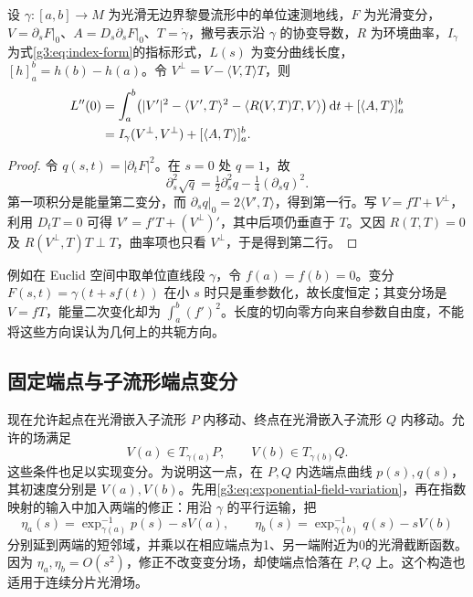 \begin{theorem}[长度第二变分]\label{g3:thm:length-second-variation}
	设 \(\gamma:[a,b]\to M\) 为光滑无边界黎曼流形中的单位速测地线，\(F\) 为光滑变分，\(V=\partial_sF|_0\)、\(A=D_s\partial_sF|_0\)、\(T=\dot\gamma\)，撇号表示沿 \(\gamma\) 的协变导数，\(R\) 为环境曲率，\(I_\gamma\) 为式\eqref{g3:eq:index-form}的指标形式，\(L(s)\) 为变分曲线长度，\([h]_a^b=h(b)-h(a)\)。令 \(V^\perp=V-\langle V,T\rangle T\)，则
	\begin{align}
		L''(0)&=\int_a^b\bigl(|V'|^2-\langle V',T\rangle^2
		-\langle R(V,T)T,V\rangle\bigr)\,\mathrm dt
		+[\langle A,T\rangle]_a^b\notag\\
		&=I_\gamma(V^\perp,V^\perp)+[\langle A,T\rangle]_a^b.
		\label{g3:eq:length-second-variation}
	\end{align}
\end{theorem}
\begin{proof}
	令 \(q(s,t)=|\partial_tF|^2\)。在 \(s=0\) 处 \(q=1\)，故
	\[
		\partial_s^2\sqrt q=\tfrac12\partial_s^2q-\tfrac14(\partial_sq)^2.
	\]
	第一项积分是能量第二变分，而 \(\partial_sq|_0=2\langle V',T\rangle\)，得到第一行。写 \(V=fT+V^\perp\)，利用 \(D_tT=0\) 可得 \(V'=f'T+(V^\perp)'\)，其中后项仍垂直于 \(T\)。又因 \(R(T,T)=0\) 及 \(R(V^\perp,T)T\perp T\)，曲率项也只看 \(V^\perp\)，于是得到第二行。
\end{proof}

例如在 Euclid 空间中取单位直线段 \(\gamma\)，令 \(f(a)=f(b)=0\)。变分 \(F(s,t)=\gamma(t+sf(t))\) 在小 \(s\) 时只是重参数化，故长度恒定；其变分场是 \(V=fT\)，能量二次变化却为 \(\int_a^b(f')^2\)。长度的切向零方向来自参数自由度，不能将这些方向误认为几何上的共轭方向。

\subsection{固定端点与子流形端点变分}
\label{g3:subsec:0601:04}

现在允许起点在光滑嵌入子流形 \(P\) 内移动、终点在光滑嵌入子流形 \(Q\) 内移动。允许的场满足
\[
	V(a)\in T_{\gamma(a)}P,\qquad V(b)\in T_{\gamma(b)}Q.
\]
这些条件也足以实现变分。为说明这一点，在 \(P,Q\) 内选端点曲线 \(p(s),q(s)\)，其初速度分别是 \(V(a),V(b)\)。先用\eqref{g3:eq:exponential-field-variation}，再在指数映射的输入中加入两端的修正：用沿 \(\gamma\) 的平行运输，把
\[
	\eta_a(s)=\exp_{\gamma(a)}^{-1}p(s)-sV(a),\qquad
	\eta_b(s)=\exp_{\gamma(b)}^{-1}q(s)-sV(b)
\]
分别延到两端的短邻域，并乘以在相应端点为1、另一端附近为0的光滑截断函数。因为 \(\eta_a,\eta_b=O(s^2)\)，修正不改变变分场，却使端点恰落在 \(P,Q\) 上。这个构造也适用于连续分片光滑场。

